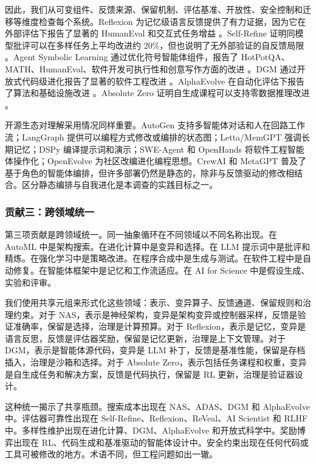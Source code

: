 因此，我们从可变组件、反馈来源、保留机制、评估基准、开放性、安全控制和迁移等维度检查每个系统。Reflexion 为记忆级语言反馈提供了有力证据，因为它在外部评估下报告了显著的 HumanEval 和交互式任务增益 \cite{reflexion2023}。Self-Refine 证明同模型批评可以在多样任务上平均改进约 20\%，但也说明了无外部验证的自反馈局限 \cite{selfrefine2023}。Agent Symbolic Learning 通过优化符号智能体组件，报告了 HotPotQA、MATH、HumanEval、软件开发可执行性和创意写作方面的改进 \cite{agentsymboliclearning2024}。DGM 通过开放式代码级进化报告了显著的软件工程改进 \cite{darwingodelmachine2025}。AlphaEvolve 在自动化评估下报告了算法和基础设施改进 \cite{alphaevolve2025}。Absolute Zero 证明自生成课程可以支持零数据推理改进 \cite{absolutezero2025}。

开源生态对理解采用情况同样重要。AutoGen 支持多智能体对话和人在回路工作流；LangGraph 提供可以编程方式修改或编排的状态图；Letta/MemGPT 强调长期记忆；DSPy 编译提示词和演示；SWE-Agent 和 OpenHands 将软件工程智能体操作化；OpenEvolve 为社区改编进化编程思想。CrewAI 和 MetaGPT 普及了基于角色的智能体编排，但许多部署仍然是静态的，除非与反馈驱动的修改相结合。区分静态编排与自我进化是本调查的实践目标之一。

\subsubsection{贡献三：跨领域统一}

第三项贡献是跨领域统一。同一抽象循环在不同领域以不同名称出现。在 AutoML 中是架构搜索。在进化计算中是变异和选择。在 LLM 提示词中是批评和精炼。在强化学习中是策略改进。在程序合成中是生成与测试。在软件工程中是自动修复。在智能体框架中是记忆和工作流适应。在 AI for Science 中是假设生成、实验和评审。

我们使用共享元组来形式化这些领域：表示、变异算子、反馈通道、保留规则和治理约束。对于 NAS，表示是神经架构，变异是架构变异或控制器采样，反馈是验证准确率，保留是选择，治理是计算预算。对于 Reflexion，表示是记忆，变异是语言反思，反馈是评估器奖励，保留是记忆更新，治理是上下文管理。对于 DGM，表示是智能体源代码，变异是 LLM 补丁，反馈是基准性能，保留是存档插入，治理是沙箱和选择。对于 Absolute Zero，表示包括任务课程和权重，变异是自生成任务和解决方案，反馈是代码执行，保留是 RL 更新，治理是验证器设计。

这种统一揭示了共享瓶颈。搜索成本出现在 NAS、ADAS、DGM 和 AlphaEvolve 中。评估器可靠性出现在 Self-Refine、Reflexion、ReVeal、AI Scientist 和 RLHF 中。多样性维护出现在进化计算、DGM、AlphaEvolve 和开放式科学中。奖励博弈出现在 RL、代码生成和基准驱动的智能体设计中。安全约束出现在任何代码或工具可被修改的地方。术语不同，但工程问题如出一辙。

